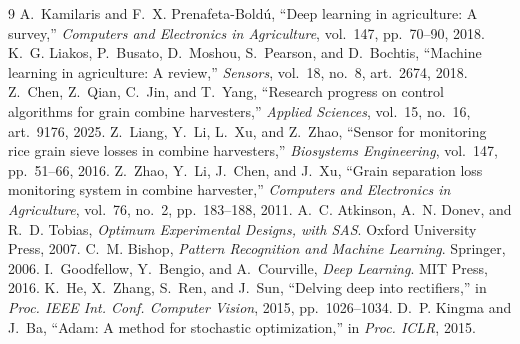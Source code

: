 \documentclass[11pt,a4paper]{article}
\begin{document}
\begin{thebibliography}{9}
A.~Kamilaris and F.~X. Prenafeta-Bold\'u,
``Deep learning in agriculture: A survey,''
\emph{Computers and Electronics in Agriculture}, vol.~147, pp.~70--90, 2018.
K.~G. Liakos, P.~Busato, D.~Moshou, S.~Pearson, and D.~Bochtis,
``Machine learning in agriculture: A review,''
\emph{Sensors}, vol.~18, no.~8, art.~2674, 2018.
Z.~Chen, Z.~Qian, C.~Jin, and T.~Yang,
``Research progress on control algorithms for grain combine harvesters,''
\emph{Applied Sciences}, vol.~15, no.~16, art.~9176, 2025.
Z.~Liang, Y.~Li, L.~Xu, and Z.~Zhao,
``Sensor for monitoring rice grain sieve losses in combine harvesters,''
\emph{Biosystems Engineering}, vol.~147, pp.~51--66, 2016.
Z.~Zhao, Y.~Li, J.~Chen, and J.~Xu,
``Grain separation loss monitoring system in combine harvester,''
\emph{Computers and Electronics in Agriculture}, vol.~76, no.~2, pp.~183--188, 2011.
A.~C. Atkinson, A.~N. Donev, and R.~D. Tobias,
\emph{Optimum Experimental Designs, with SAS}.
Oxford University Press, 2007.
C.~M. Bishop, \emph{Pattern Recognition and Machine Learning}. Springer, 2006.
I.~Goodfellow, Y.~Bengio, and A.~Courville, \emph{Deep Learning}. MIT Press, 2016.
K.~He, X.~Zhang, S.~Ren, and J.~Sun,
``Delving deep into rectifiers,''
in \emph{Proc. IEEE Int. Conf. Computer Vision}, 2015, pp.~1026--1034.
D.~P. Kingma and J.~Ba,
``Adam: A method for stochastic optimization,''
in \emph{Proc. ICLR}, 2015.
\end{thebibliography}
\end{document}
